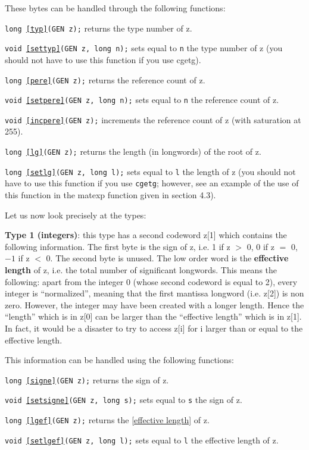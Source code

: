 These bytes can be handled through the following functions:

{\tt long \ref{typ}(GEN z);} returns the type number of z.

{\tt void \ref{settyp}(GEN z, long n);} sets equal to {\tt n} the type number of z
(you should not have to use this function if you use cgetg).

{\tt long \ref{pere}(GEN z);} returns the reference count of z.

{\tt void \ref{setpere}(GEN z, long n);} sets equal to {\tt n} the reference count of z.

{\tt void \ref{incpere}(GEN z);} increments the reference count of z
(with saturation at 255).

{\tt long \ref{lg}(GEN z);} returns the length (in longwords) of the root of z.

{\tt long \ref{setlg}(GEN z, long l);} sets equal to {\tt l} the length of z 
(you should not have to use this function if you use {\tt cgetg}; however,
see an example of the use of this function in the matexp function given in 
section 4.3).

Let us now look precisely at the types:

{\bf Type 1 (integers)}: 
this type has a second codeword z[1] which contains the
following information. The first byte is the sign of z, i.e. 1 if z $>$ 0,
0 if z $=$ 0, $-1$ if z $<$ 0. The second byte is unused. The low order word is
the {\bf effective length} of z, i.e. the total number of significant longwords.
This means the following: apart from the integer 0 (whose second codeword is
equal to 2), every integer is ``normalized'', meaning that the first
mantissa longword (i.e. z[2]) is non zero. However, the integer may have been
created with a longer length. Hence the ``length'' which is in z[0] can
be larger than the ``effective length'' which is in z[1]. In fact, it would be
a disaster to try to access z[i] for i larger than or equal to the effective length.

This information can be handled using the following functions:

{\tt long \ref{signe}(GEN z);} returns the sign of z.

{\tt void \ref{setsigne}(GEN z, long s);} sets equal to {\tt s} the sign of z.

{\tt long \ref{lgef}(GEN z);} returns the \ref{effective length} of z.

{\tt void \ref{setlgef}(GEN z, long l);} sets equal to {\tt l} the effective length of z.


